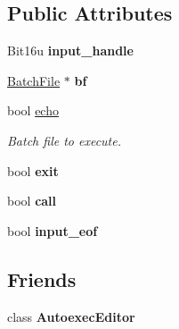 \subsection*{Public Attributes}
\begin{DoxyCompactItemize}
\item 
\hypertarget{classDOS__Shell_ae7e99ec60f0525ac0b2824e2ae020fa2}{Bit16u {\bfseries input\-\_\-handle}}\label{classDOS__Shell_ae7e99ec60f0525ac0b2824e2ae020fa2}

\item 
\hypertarget{classDOS__Shell_a812e2fbcc49d3523e5939235c1784a8f}{\hyperlink{classBatchFile}{Batch\-File} $\ast$ {\bfseries bf}}\label{classDOS__Shell_a812e2fbcc49d3523e5939235c1784a8f}

\item 
\hypertarget{classDOS__Shell_ab4ee052352ed1dedccf0854bcacadac2}{bool \hyperlink{classDOS__Shell_ab4ee052352ed1dedccf0854bcacadac2}{echo}}\label{classDOS__Shell_ab4ee052352ed1dedccf0854bcacadac2}

\begin{DoxyCompactList}\small\item\em Batch file to execute. \end{DoxyCompactList}\item 
\hypertarget{classDOS__Shell_ad687b7ce53d445c65c56891acd4aa660}{bool {\bfseries exit}}\label{classDOS__Shell_ad687b7ce53d445c65c56891acd4aa660}

\item 
\hypertarget{classDOS__Shell_a97d3128aca26624607d9e3acd183cfae}{bool {\bfseries call}}\label{classDOS__Shell_a97d3128aca26624607d9e3acd183cfae}

\item 
\hypertarget{classDOS__Shell_afe355c7cf53320fef3c696ee73d4de47}{bool {\bfseries input\-\_\-eof}}\label{classDOS__Shell_afe355c7cf53320fef3c696ee73d4de47}

\end{DoxyCompactItemize}
\subsection*{Friends}
\begin{DoxyCompactItemize}
\item 
\hypertarget{classDOS__Shell_abca6adc7a2081b5b03c267fdae1d0b8d}{class {\bfseries Autoexec\-Editor}}\label{classDOS__Shell_abca6adc7a2081b5b03c267fdae1d0b8d}

\end{DoxyCompactItemize}


